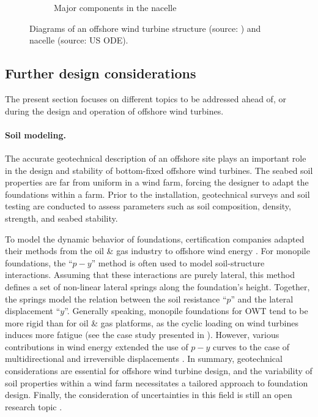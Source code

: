 \begin{figure}
\begin{subfigure}[b]{0.48\textwidth}
        \caption{Major components in the nacelle}
        \label{fig:nacelle_components}
    \end{subfigure}
    \caption{Diagrams of an offshore wind turbine structure (source: \citep{chen_2018_owt_diagram}) and nacelle (source: US ODE).}
    \label{fig:owt_diagram}
\end{figure}

\subsection{Further design considerations}
The present section focuses on different topics to be addressed ahead of, or during the design and operation of offshore wind turbines.

\paragraph{Soil modeling.}
The accurate geotechnical description of an offshore site plays an important role in the design and stability of bottom-fixed offshore wind turbines. 
The seabed soil properties are far from uniform in a wind farm, forcing the designer to adapt the foundations within a farm. 
Prior to the installation, geotechnical surveys and soil testing are conducted to assess parameters such as soil composition, density, strength, and seabed stability. 

To model the dynamic behavior of foundations, certification companies adapted their methods from the oil \& gas industry to offshore wind energy \citep{dnv_2018_soil}. 
For monopile foundations, the ``$p-y$'' method is often used to model soil-structure interactions. 
Assuming that these interactions are purely lateral, this method defines a set of non-linear lateral springs along the foundation's height.  
Together, the springs model the relation between the soil resistance ``$p$'' and the lateral displacement ``$y$''. 
Generally speaking, monopile foundations for OWT tend to be more rigid than for oil \& gas platforms, as the cyclic loading on wind turbines induces more fatigue (see the case study presented in \citet{le_2014_geotech_casestudy}).  
However, various contributions in wind energy extended the use of $p-y$ curves to the case of multidirectional and irreversible displacements \citep{lovera_2019_thesis}. 
In summary, geotechnical considerations are essential for offshore wind turbine design, and the variability of soil properties within a wind farm necessitates a tailored approach to foundation design. 
Finally, the consideration of uncertainties in this field is still an open research topic \citep{reale_2021_OWT_soil_uncertainties}.

